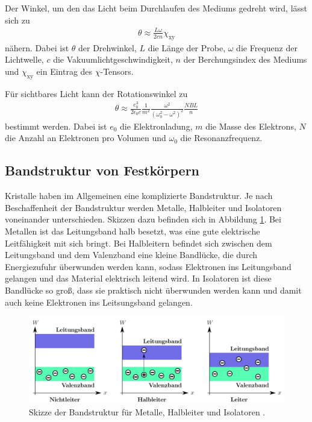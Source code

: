 Der Winkel, um den das Licht beim Durchlaufen des Mediums gedreht wird, lässt sich zu
\begin{align}
  \theta \approx \frac{L \omega}{2 c n}\chi_{\mathrm{xy}}
  \label{eqn:theta1}
\end{align}
nähern. Dabei ist $\theta$ der Drehwinkel, $L$ die Länge der Probe, $\omega$ die Frequenz
der Lichtwelle, $c$ die Vakuumlichtgeschwindigkeit, $n$ der Berchungsindex des Mediums
und $\chi_{\mathrm{xy}}$ ein Eintrag des $\chi$-Tensors.

Für sichtbares Licht kann der Rotationswinkel zu
\begin{align}
  \theta \approx \frac{e^3_0}{2 \epsilon_0 c} \frac{1}{m^2}\frac{\omega^2}{(\omega^2_0 - \omega^2)^2} \frac{NBL}{n}
  \label{eqn:theta2}
\end{align}
bestimmt werden. Dabei ist $e_0$ die Elektronladung, $m$ die Masse des Elektrons, $N$
die Anzahl an Elektronen pro Volumen und $\omega_0$ die Resonanzfrequenz.


\subsection{Bandstruktur von Festkörpern}
\label{subsec:bandstruktur}

Kristalle haben im Allgemeinen eine komplizierte Bandstruktur. Je nach Beschaffenheit
der Bandstruktur werden Metalle, Halbleiter und Isolatoren voneinander unterschieden.
Skizzen dazu befinden sich in Abbildung \ref{fig:bandstruktur}.
Bei Metallen ist das Leitungsband halb besetzt, was eine gute elektrische Leitfähigkeit
mit sich bringt. Bei Halbleitern befindet sich zwischen dem Leitungsband und dem
Valenzband eine kleine Bandlücke, die durch Energiezufuhr überwunden
werden kann, sodass Elektronen ins Leitungsband gelangen und das Material elektrisch
leitend wird. In Isolatoren ist diese Bandlücke so groß, dass sie praktisch nicht
überwunden werden kann und damit auch keine Elektronen ins Leitsungsband gelangen.

\begin{figure}[h!]
  \centering
  \includegraphics[width=\textwidth]{data/bandstruktur.png}
  \caption{Skizze der Bandstruktur für Metalle, Halbleiter und Isolatoren \cite{wiki}.}
  \label{fig:bandstruktur}
\end{figure}

